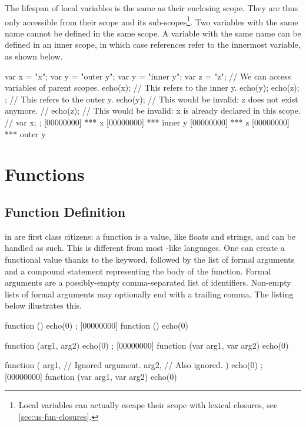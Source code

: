 The lifespan of local variables is the same as their enclosing scope. They
are thus only accessible from their scope and its
sub-scopes\footnote{Local variables can actually escape their scope
  with lexical closures, see \autoref{sec:us-fun-closures}.}. Two
variables with the same name cannot be defined in the same scope. A
variable with the same name can be defined in an inner scope, in which
case references refer to the innermost variable, as shown below.

\begin{urbiscript}
{
  var x = "x";
  var y = "outer y";
  {
    var y = "inner y";
    var z = "z";
    // We can access variables of parent scopes.
    echo(x);
    // This refers to the inner y.
    echo(y);
    echo(z);
  };
  // This refers to the outer y.
  echo(y);
  // This would be invalid: z does not exist anymore.
  // echo(z);
  // This would be invalid: x is already declared in this scope.
  // var x;
};
[00000000] *** x
[00000000] *** inner y
[00000000] *** z
[00000000] *** outer y
\end{urbiscript}


\section{Functions}

\subsection{Function Definition}
\label{sec:lang:function}
 in \us are first class citizens: a function is a value, like
floats and strings, and can be handled as such.  This is different from most
\C-like languages.  One can create a functional value thanks to the
 keyword, followed by the list of formal arguments and a
compound statement representing the body of the function. Formal arguments
are a possibly-empty comma-separated list of identifiers.  Non-empty lists
of formal arguments may optionally end with a trailing comma. The listing
below illustrates this.

\begin{urbiscript}
function () { echo(0) };
[00000000] function () { echo(0) }

function (arg1, arg2) { echo(0) };
[00000000] function (var arg1, var arg2) { echo(0) }

function (
           arg1, // Ignored argument.
           arg2, // Also ignored.
          )
{
  echo(0)
};
[00000000] function (var arg1, var arg2) { echo(0) }
\end{urbiscript}


